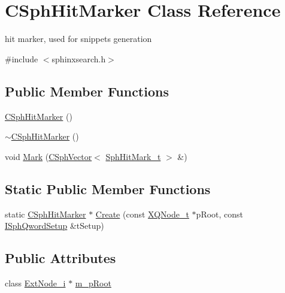 \hypertarget{classCSphHitMarker}{\section{C\-Sph\-Hit\-Marker Class Reference}
\label{classCSphHitMarker}
}


hit marker, used for snippets generation  




{\ttfamily \#include $<$sphinxsearch.\-h$>$}

\subsection*{Public Member Functions}
\begin{DoxyCompactItemize}
\item 
\hyperlink{classCSphHitMarker_a01dc1d8d132f937d712047189209d0c7}{C\-Sph\-Hit\-Marker} ()
\item 
\hyperlink{classCSphHitMarker_a7a621adb9569faf36e0c9e23409f4480}{$\sim$\-C\-Sph\-Hit\-Marker} ()
\item 
void \hyperlink{classCSphHitMarker_a091e0cb63805d66b6b5d13dcba5f888f}{Mark} (\hyperlink{classCSphVector}{C\-Sph\-Vector}$<$ \hyperlink{structSphHitMark__t}{Sph\-Hit\-Mark\-\_\-t} $>$ \&)
\end{DoxyCompactItemize}
\subsection*{Static Public Member Functions}
\begin{DoxyCompactItemize}
\item 
static \hyperlink{classCSphHitMarker}{C\-Sph\-Hit\-Marker} $\ast$ \hyperlink{classCSphHitMarker_a3f135e04501d955e8513373d72d2296c}{Create} (const \hyperlink{structXQNode__t}{X\-Q\-Node\-\_\-t} $\ast$p\-Root, const \hyperlink{classISphQwordSetup}{I\-Sph\-Qword\-Setup} \&t\-Setup)
\end{DoxyCompactItemize}
\subsection*{Public Attributes}
\begin{DoxyCompactItemize}
\item 
class \hyperlink{classExtNode__i}{Ext\-Node\-\_\-i} $\ast$ \hyperlink{classCSphHitMarker_a5ebde5ac8136b18501f163e06a38cf2a}{m\-\_\-p\-Root}
\end{DoxyCompactItemize}


